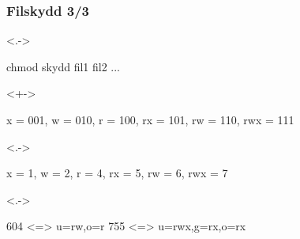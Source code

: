\begin{frame}[fragile,t]
    \frametitle{Filskydd 3/3}

    \begin{onlyenv}<.->
        \begin{GobbleCode}{8}
            chmod skydd fil1 fil2 ...
        \end{GobbleCode}
    \end{onlyenv}


    \halfblankline

    \begin{onlyenv}<+->
        \begin{GobbleCode}{8}
            x = 001, w = 010, r = 100, rx = 101, rw = 110, rwx = 111
        \end{GobbleCode}
    \end{onlyenv}



    \begin{onlyenv}<.->
        \begin{GobbleCode}{8}
            x = 1, w = 2, r = 4, rx = 5, rw = 6, rwx = 7
        \end{GobbleCode}
    \end{onlyenv}



    \begin{onlyenv}<.->
        \begin{GobbleCode}{8}
            604 <=> u=rw,o=r    755 <=> u=rwx,g=rx,o=rx
        \end{GobbleCode}
    \end{onlyenv}
\end{frame}

